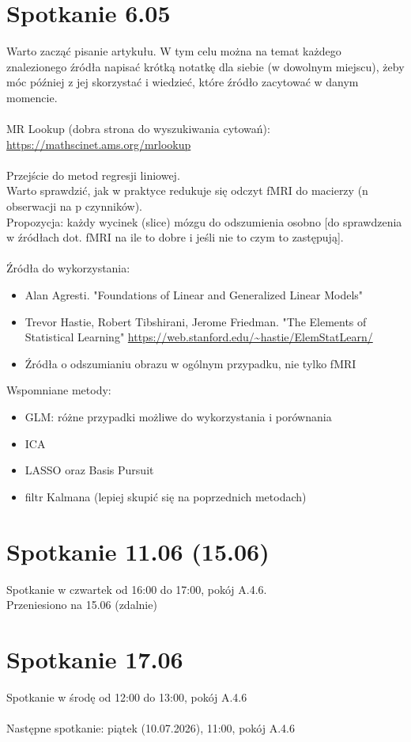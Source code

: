 \documentclass{article}
\begin{document}
\section{Spotkanie 6.05}
Warto zacząć pisanie artykułu. W tym celu można na temat każdego znalezionego źródła napisać krótką notatkę dla siebie (w dowolnym miejscu), żeby móc później z jej skorzystać i wiedzieć, które źródło zacytować w danym momencie.\\\\
MR Lookup (dobra strona do wyszukiwania cytowań):\\
\url{https://mathscinet.ams.org/mrlookup}\\\\
\noindent
Przejście do metod regresji liniowej.\\
Warto sprawdzić, jak w praktyce redukuje się odczyt fMRI do macierzy (n obserwacji na p czynników).\\
Propozycja: każdy wycinek (slice) mózgu do odszumienia osobno [do sprawdzenia w źródłach dot. fMRI na ile to dobre i jeśli nie to czym to zastępują].\\\\

\noindent
Źródła do wykorzystania:
\begin{itemize}
    \item Alan Agresti. "Foundations 
of Linear and Generalized  Linear Models"
\item Trevor Hastie, Robert Tibshirani, Jerome Friedman. "The Elements of Statistical Learning" \url{https://web.stanford.edu/~hastie/ElemStatLearn/}
\item Źródła o odszumianiu obrazu w ogólnym przypadku, nie tylko fMRI
\end{itemize}
Wspomniane metody:
\begin{itemize}
    \item GLM: różne przypadki możliwe do wykorzystania i porównania
    \item ICA
    \item LASSO oraz Basis Pursuit
    \item filtr Kalmana (lepiej skupić się na poprzednich metodach)
\end{itemize}

\section{Spotkanie 11.06 (15.06)}
\noindent
Spotkanie w czwartek od 16:00 do 17:00, pokój A.4.6.\\
Przeniesiono na 15.06 (zdalnie)

\section{Spotkanie 17.06}
\noindent
Spotkanie w środę od 12:00 do 13:00, pokój A.4.6\\\\

\noindent
Następne spotkanie: piątek (10.07.2026), 11:00, pokój A.4.6
\end{document}

